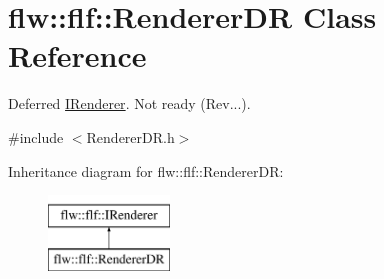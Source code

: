 \hypertarget{classflw_1_1flf_1_1RendererDR}{}\section{flw\+:\+:flf\+:\+:Renderer\+DR Class Reference}
\label{classflw_1_1flf_1_1RendererDR}


Deferred \hyperlink{classflw_1_1flf_1_1IRenderer}{I\+Renderer}. Not ready (Rev...).  




{\ttfamily \#include $<$Renderer\+D\+R.\+h$>$}

Inheritance diagram for flw\+:\+:flf\+:\+:Renderer\+DR\+:\begin{figure}[H]
\begin{center}
\leavevmode
\includegraphics[height=2.000000cm]{classflw_1_1flf_1_1RendererDR}
\end{center}
\end{figure}
